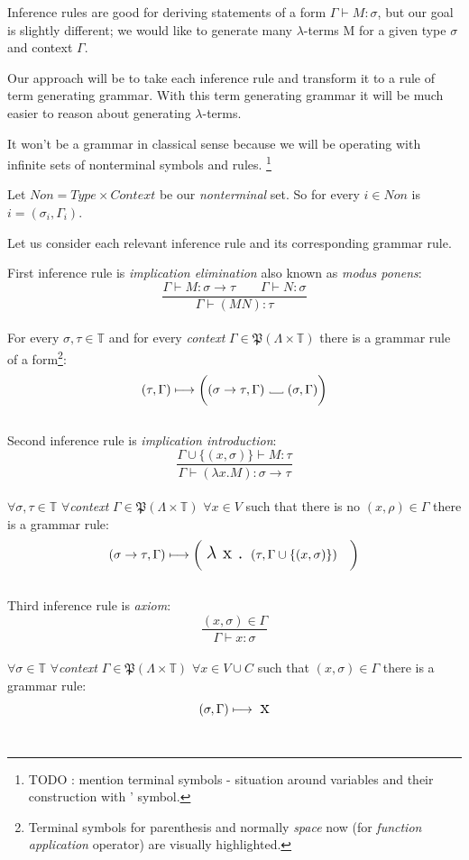 \documentclass[12pt,a4paper]{report}
\newcommand{\Lets}{Let us\xspace}
\newcommand{\lterms}{$\lambda$-terms\xspace}
\newcommand{\turst}[3]{$#1 \vdash #2 : #3$\xspace}
\newcommand{\GMS}{\turst{\Gamma}{M}{\sigma}}
\newcommand\Vtextvisiblespace[1][.3em]{%
  \mbox{\kern.06em\vrule height.3ex}%
  \vbox{\hrule width#1}%
  \hbox{\vrule height.3ex}}
\begin{document}
Inference rules are good for deriving statements of a form \GMS, but our
goal is slightly different; we would like to generate many \lterms M for a given type 
$\sigma$ and context $\Gamma$.

Our approach will be to take each inference rule and transform it to a rule of term generating
grammar. With this term generating grammar it will be much easier to reason about generating 
\lterms.
	
It won't be a grammar in classical sense because we will be operating with infinite sets of
nonterminal symbols and rules. \footnote{TODO : mention terminal symbols - situation around 
variables and their construction with ' symbol.}

Let $Non = Type \times Context $ be our {\it nonterminal} set. 
So for every $i \in Non$ is $i = (\sigma_i , \Gamma_i )$.

\Lets consider each relevant inference rule and its corresponding grammar rule.

First inference rule is {\it implication elimination} also known as 
{\it modus ponens}: 
\[
	\frac{\Gamma \vdash M : \sigma \rightarrow \tau \qquad
		  \Gamma \vdash N : \sigma }
	     {\Gamma \vdash (M N) : \tau }
\]
\\
For every $\sigma, \tau \in \mathbb{T}$ and for every {\it context} 
$\Gamma \in \mathfrak P \left({\Lambda \times  \mathbb{T}}\right)$ there is a grammar rule of a form\footnote{ 
Terminal symbols for parenthesis and normally {\it space} now \textvisiblespace \quad (for {\it function application} operator) are visually highlighted. }: 
\[	
	( \tau , \Gamma )  \longmapsto
	\bigg( ( \sigma \rightarrow \tau , \Gamma ) 
	  \mbox{ \Vtextvisiblespace[1em] } ( \sigma , \Gamma ) \bigg)
\]
\\

Second inference rule is {\it implication introduction}: 
\[
	\frac{\Gamma \cup \{ ( x,\sigma ) \} \vdash M : \tau }
	     {\Gamma \vdash (\lambda x . M) : \sigma \rightarrow \tau }
\]
\\
$\forall \sigma, \tau \in \mathbb{T}$ 
$\forall${\it context} $\Gamma \in \mathfrak P \left({\Lambda \times  \mathbb{T}}\right) $ 
$\forall x \in V $ such that there is no $(x,\rho) \in \Gamma$ 
there is a grammar rule:
\[ 
	( \sigma \rightarrow \tau , \Gamma )  \longmapsto
	\bigg( \mbox{ {\Large $\lambda$ x . }}( \tau , \Gamma \cup \{ (x,\sigma) \} ) \quad \bigg)
\]
\\	

Third inference rule is {\it axiom}: 
\[
		\frac{( x , \sigma )  \in \Gamma}
		     {\Gamma \vdash x : \sigma}
\]
\\
$\forall \sigma \in \mathbb{T}$ 
$\forall${\it context} $\Gamma \in \mathfrak P \left({\Lambda \times  \mathbb{T}}\right) $ 
$\forall x \in V \cup C $ such that $(x,\sigma) \in \Gamma$ 
there is a grammar rule:
\[ 
	( \sigma , \Gamma )  \longmapsto \mbox{ {\Large x}}
\]
\\
\end{document}
